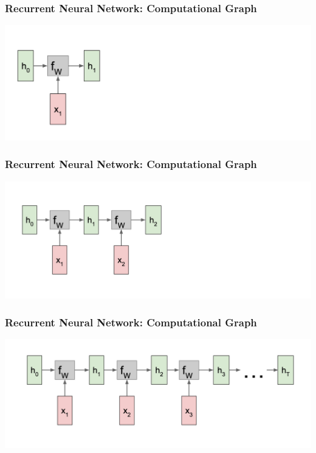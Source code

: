 \documentclass[aspectratio=1610]{beamer} %
\begin{document}
\begin{frame}

\frametitle{Recurrent Neural Network: Computational Graph}

\begin{center}
\includegraphics[width=\textwidth]{pics/rnngraph1}
\end{center}

\end{frame}

\begin{frame}

\frametitle{Recurrent Neural Network: Computational Graph}

\begin{center}
\includegraphics[width=\textwidth]{pics/rnngraph2}
\end{center}

\end{frame}

\begin{frame}

\frametitle{Recurrent Neural Network: Computational Graph}

\begin{center}
\includegraphics[width=\textwidth]{pics/rnngraph3}
\end{center}

\end{frame}
\end{document}
